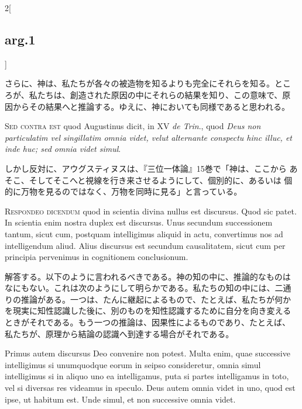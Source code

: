 \documentclass[paper=a4paper,fontsize=10pt,jafontsize=9pt,titlepage]{jlreq}
\begin{document}
\begin{paracol}{2}[\subsection{arg.1}]
\switchcolumn

さらに、神は、私たちが各々の被造物を知るよりも完全にそれらを知る。とこ
ろが、私たちは、創造された原因の中にそれらの結果を知り、この意味で、原
因からその結果へと推論する。ゆえに、神においても同様であると思われる。

\switchcolumn*[\subsection{s.c.}]

{\scshape Sed contra est} quod Augustinus dicit, in XV {\itshape de
Trin}., quod {\itshape Deus non particulatim vel singillatim omnia
videt, velut alternante conspectu hinc illuc, et inde huc; sed omnia
videt simul}.

\switchcolumn

しかし反対に、アウグスティヌスは、『三位一体論』15巻で「神は、ここから
あそこ、そしてそこへと視線を行き来させるようにして、個別的に、あるいは
個的に万物を見るのではなく、万物を同時に見る」と言っている。


{\scshape Respondeo dicendum} quod in scientia divina nullus est
discursus. Quod sic patet. In scientia enim nostra duplex est
discursus. Unus secundum successionem tantum, sicut cum, postquam
intelligimus aliquid in actu, convertimus nos ad intelligendum aliud.
Alius discursus est secundum causalitatem, sicut cum per principia
pervenimus in cognitionem conclusionum.

\switchcolumn

解答する。以下のように言われるべきである。神の知の中に、推論的なものは
なにもない。これは次のようにして明らかである。私たちの知の中には、二通
りの推論がある。一つは、たんに継起によるもので、たとえば、私たちが何か
を現実に知性認識した後に、別のものを知性認識するために自分を向き変える
ときがそれである。もう一つの推論は、因果性によるものであり、たとえば、
私たちが、原理から結論の認識へ到達する場合がそれである。

\switchcolumn*

Primus autem discursus Deo convenire non potest. Multa enim, quae
successive intelligimus si unumquodque eorum in seipso consideretur,
omnia simul intelligimus si in aliquo uno ea intelligamus, puta si
partes intelligamus in toto, vel si diversas res videamus in
speculo. Deus autem omnia videt in uno, quod est ipse, ut habitum est.
Unde simul, et non successive omnia videt.


\end{paracol}
\end{document}
